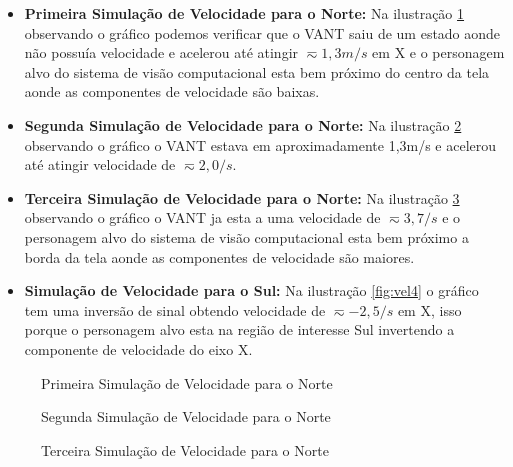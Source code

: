 \begin{itemize}
	\item \textbf{Primeira Simulação de Velocidade para o Norte:} Na ilustração \ref{fig:vel1} observando o gráfico podemos verificar que o VANT saiu de um estado aonde não possuía velocidade e acelerou até atingir $\displaystyle \eqsim1,3m/s$ em X e o personagem alvo do sistema de visão computacional esta bem próximo do centro da tela aonde as componentes de velocidade são baixas.
	
	\item \textbf{Segunda Simulação de Velocidade para o Norte:} Na ilustração \ref{fig:vel2} observando o gráfico o VANT estava em aproximadamente 1,3m/s e acelerou até atingir velocidade de $\displaystyle \eqsim2,0/s$. 
	
	\item \textbf{Terceira Simulação de Velocidade para o Norte:} Na ilustração \ref{fig:vel3} observando o gráfico o VANT ja esta a uma velocidade de $\displaystyle \eqsim3,7/s$ e o personagem alvo do sistema de visão computacional esta bem próximo a borda da tela aonde as componentes de velocidade são maiores. 
	
	\item \textbf{Simulação de Velocidade para o Sul:} Na ilustração \ref{fig:vel4} o gráfico tem uma inversão de sinal obtendo velocidade de $\displaystyle \eqsim-2,5/s$ em X, isso porque o personagem alvo esta na região de interesse Sul invertendo a componente de velocidade do eixo X.
\end{itemize} 

\begin{figure}[H]
	\centering	
	\caption{Primeira Simulação de Velocidade para o Norte}
	\def\svgwidth{15cm}
	
	\label{fig:vel1}
\end{figure}

\begin{figure}[H]
	\centering	
	\caption{Segunda Simulação de Velocidade para o Norte}
	\def\svgwidth{15cm}
	
	\label{fig:vel2}
\end{figure}

\begin{figure}[H]
	\centering	
	\caption{Terceira Simulação de Velocidade para o Norte}
	\def\svgwidth{15cm}
	
	\label{fig:vel3}
\end{figure}

